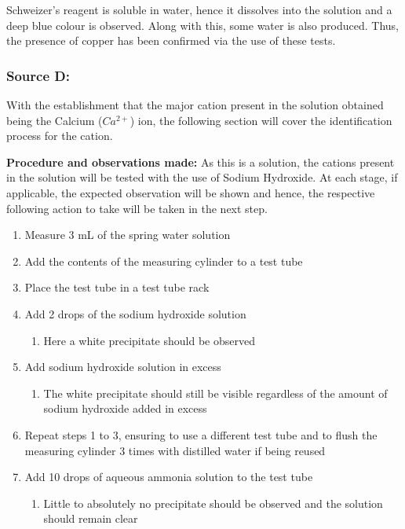 \documentclass[11pt, a4]{article}
\begin{document}
			Schweizer's reagent is soluble in water, hence it dissolves into the solution and a deep blue colour is observed. Along with this, some water is also produced. Thus, the presence of copper has been confirmed via the use of these tests.

			\subsubsection{Source D:}
			With the establishment that the major cation present in the solution obtained being the Calcium ($Ca^{2+}$) ion, the following section will cover the identification process for the cation.

			\noindent \textbf{Procedure and observations made:}
			\newline
				As this is a solution, the cations present in the solution will be tested with the use of Sodium Hydroxide. At each stage, if applicable, the expected observation will be shown and hence, the respective following action to take will be taken in the next step.
				\begin{enumerate}
					\item Measure 3 mL of the spring water solution
					\item Add the contents of the measuring cylinder to a test tube
					\item Place the test tube in a test tube rack
					\item Add 2 drops of the sodium hydroxide solution
						\begin{enumerate}
							\item Here a white precipitate should be observed
						\end{enumerate}
					\item Add sodium hydroxide solution in excess
						\begin{enumerate}
							\item The white precipitate should still be visible regardless of the amount of sodium hydroxide added in excess
						\end{enumerate}
					\item Repeat steps 1 to 3, ensuring to use a different test tube and to flush the measuring cylinder 3 times with distilled water if being reused
					\item Add 10 drops of aqueous ammonia solution to the test tube
					\begin{enumerate}
						\item Little to absolutely no precipitate should be observed and the solution should remain clear
					\end{enumerate}
				\end{enumerate}
			
\end{document}
